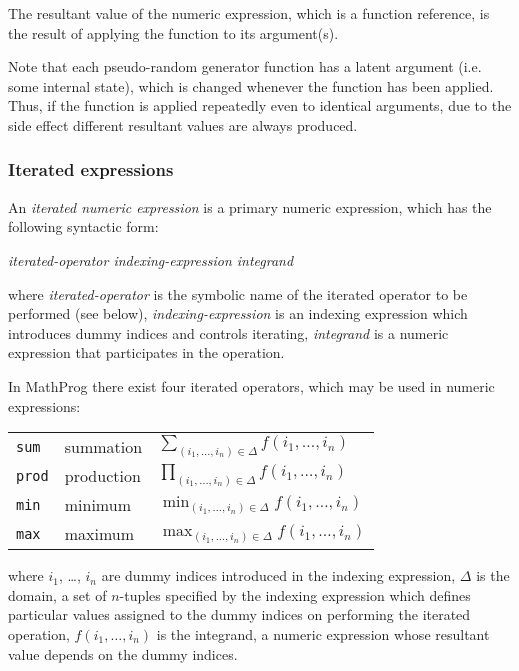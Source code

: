 \documentclass[10pt]{article}
\begin{document}
The resultant value of the numeric expression, which is a function
reference, is the result of applying the function to its argument(s).

Note that each pseudo-random generator function has a latent argument
(i.e. some internal state), which is changed whenever the function has
been applied. Thus, if the function is applied repeatedly even to
identical arguments, due to the side effect different resultant values
are always produced.

\subsubsection{Iterated expressions}
\label{itexpr}

An {\it iterated numeric expression} is a primary numeric expression,
which has the following syntactic form:

\medskip

\noindent\hfil
{\it iterated-operator indexing-expression integrand}

\medskip

\noindent where {\it iterated-operator} is the symbolic name of the
iterated operator to be performed (see below), {\it indexing-expression}
is an indexing expression which introduces dummy indices and controls
iterating, {\it integrand} is a numeric expression that participates in
the operation.

In MathProg there exist four iterated operators, which may be used in
numeric expressions:

\medskip

\noindent\hfil
\begin{tabular}{@{}lll@{}}
{\tt sum}&summation&$\displaystyle\sum_{(i_1,\dots,i_n)\in\Delta}
f(i_1,\dots,i_n)$\\
{\tt prod}&production&$\displaystyle\prod_{(i_1,\dots,i_n)\in\Delta}
f(i_1,\dots,i_n)$\\
{\tt min}&minimum&$\displaystyle\min_{(i_1,\dots,i_n)\in\Delta}
f(i_1,\dots,i_n)$\\
{\tt max}&maximum&$\displaystyle\max_{(i_1,\dots,i_n)\in\Delta}
f(i_1,\dots,i_n)$\\
\end{tabular}

\medskip

\noindent where $i_1$, \dots, $i_n$ are dummy indices introduced in
the indexing expression, $\Delta$ is the domain, a set of $n$-tuples
specified by the indexing expression which defines particular values
assigned to the dummy indices on performing the iterated operation,
$f(i_1,\dots,i_n)$ is the integrand, a numeric expression whose
resultant value depends on the dummy indices.
\end{document}
